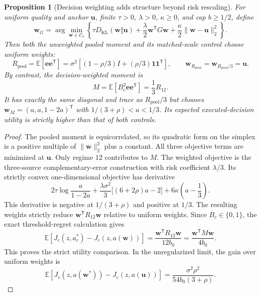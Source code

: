 \documentclass[10pt]{article}
\newtheorem{proposition}{Proposition}
\begin{document}
\begin{proposition}[Decision weighting adds structure beyond risk rescaling]
For uniform quality and anchor $\boldsymbol u$, finite $\tau>0$,
$\lambda>0$, $\kappa\ge0$, and cap $b\ge1/2$, define
\begin{equation}
 \boldsymbol w_G=\arg\min_{\boldsymbol w\in\mathcal C_b}
 \left\{\tau D_{\mathrm{KL}}(\boldsymbol w\Vert\boldsymbol u)
 +\frac\lambda2\boldsymbol w^{\mathsf T}G\boldsymbol w
 +\frac\kappa2\|\boldsymbol w-\boldsymbol u\|_2^2\right\}.
\end{equation}
Then both the unweighted pooled moment and its matched-scale control choose
uniform weights:
\begin{equation}
 R_{\mathrm{pool}}=\mathbb E[\boldsymbol e\boldsymbol e^{\mathsf T}]
 =\sigma^2\left[(1-\rho/3)I+(\rho/3)
 \boldsymbol1\boldsymbol1^{\mathsf T}\right],
 \qquad
 \boldsymbol w_{R_{\mathrm{pool}}}
 =\boldsymbol w_{R_{\mathrm{pool}}/3}=\boldsymbol u.
\end{equation}
By contrast, the decision-weighted moment is
\begin{equation}
 M=\mathbb E[B_c^2\boldsymbol e\boldsymbol e^{\mathsf T}]
 =\frac13 R_{12}.
 \label{eq:decision-moment-increment}
\end{equation}
It has exactly the same diagonal and trace as
$R_{\mathrm{pool}}/3$ but chooses
$\boldsymbol w_M=(a,a,1-2a)^{\mathsf T}$ with
$1/(3+\rho)<a<1/3$. Its expected executed-decision utility is strictly
higher than that of both controls.
\end{proposition}

\begin{proof}
The pooled moment is equicorrelated, so its quadratic form on the simplex
is a positive multiple of $\|\boldsymbol w\|_2^2$ plus a constant.
All three objective terms are minimized at $\boldsymbol u$.
Only regime $12$ contributes to $M$. The weighted objective is the
three-source complementary-error construction with risk coefficient
$\lambda/3$. Its strictly convex one-dimensional objective has derivative
\begin{equation}
 2\tau\log\frac a{1-2a}
 +\frac{\lambda\sigma^2}{3}\big[(6+2\rho)a-2\big]
 +6\kappa\left(a-\frac13\right).
\end{equation}
This derivative is negative at $1/(3+\rho)$ and positive at $1/3$.
The resulting weights strictly reduce
$\boldsymbol w^{\mathsf T}R_{12}\boldsymbol w$ relative to uniform weights.
Since $B_c\in\{0,1\}$, the exact threshold-regret calculation gives
\begin{equation}
 \mathbb E[J_c(z,a_c^*)-J_c(z,a(\boldsymbol w))]
 =\frac{\boldsymbol w^{\mathsf T}R_{12}\boldsymbol w}{12b_0}
 =\frac{\boldsymbol w^{\mathsf T}M\boldsymbol w}{4b_0}.
 \label{eq:weighted-regret-exact-control}
\end{equation}
This proves the strict utility comparison. In the unregularized limit, the
gain over uniform weights is
\begin{equation}
 \mathbb E[J_c(z,a(\boldsymbol w^*))-J_c(z,a(\boldsymbol u))]
 =\frac{\sigma^2\rho^2}{54b_0(3+\rho)}.
\end{equation}
\end{proof}
\end{document}
